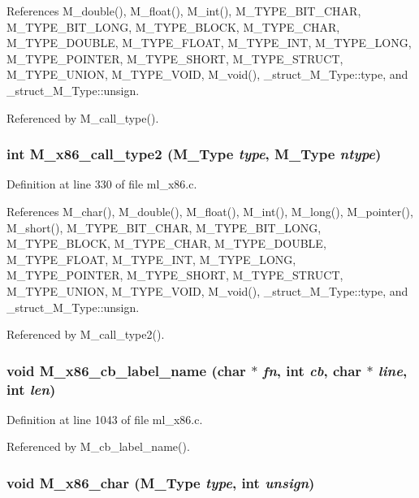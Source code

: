 References M\_\-double(), M\_\-float(), M\_\-int(), M\_\-TYPE\_\-BIT\_\-CHAR, M\_\-TYPE\_\-BIT\_\-LONG, M\_\-TYPE\_\-BLOCK, M\_\-TYPE\_\-CHAR, M\_\-TYPE\_\-DOUBLE, M\_\-TYPE\_\-FLOAT, M\_\-TYPE\_\-INT, M\_\-TYPE\_\-LONG, M\_\-TYPE\_\-POINTER, M\_\-TYPE\_\-SHORT, M\_\-TYPE\_\-STRUCT, M\_\-TYPE\_\-UNION, M\_\-TYPE\_\-VOID, M\_\-void(), \_\-struct\_\-M\_\-Type::type, and \_\-struct\_\-M\_\-Type::unsign.

Referenced by M\_\-call\_\-type().
\subsubsection{\setlength{\rightskip}{0pt plus 5cm}int M\_\-x86\_\-call\_\-type2 (\bf{M\_\-Type} {\em type}, \bf{M\_\-Type} {\em ntype})}\label{m__x86_8h_a2b8eeed98c4e10d36db0cf9955b7a13}




Definition at line 330 of file ml\_\-x86.c.

References M\_\-char(), M\_\-double(), M\_\-float(), M\_\-int(), M\_\-long(), M\_\-pointer(), M\_\-short(), M\_\-TYPE\_\-BIT\_\-CHAR, M\_\-TYPE\_\-BIT\_\-LONG, M\_\-TYPE\_\-BLOCK, M\_\-TYPE\_\-CHAR, M\_\-TYPE\_\-DOUBLE, M\_\-TYPE\_\-FLOAT, M\_\-TYPE\_\-INT, M\_\-TYPE\_\-LONG, M\_\-TYPE\_\-POINTER, M\_\-TYPE\_\-SHORT, M\_\-TYPE\_\-STRUCT, M\_\-TYPE\_\-UNION, M\_\-TYPE\_\-VOID, M\_\-void(), \_\-struct\_\-M\_\-Type::type, and \_\-struct\_\-M\_\-Type::unsign.

Referenced by M\_\-call\_\-type2().
\subsubsection{\setlength{\rightskip}{0pt plus 5cm}void M\_\-x86\_\-cb\_\-label\_\-name (char $\ast$ {\em fn}, int {\em cb}, char $\ast$ {\em line}, int {\em len})}\label{m__x86_8h_c47605e04d84eb266b6b962b0e12ad75}




Definition at line 1043 of file ml\_\-x86.c.

Referenced by M\_\-cb\_\-label\_\-name().
\subsubsection{\setlength{\rightskip}{0pt plus 5cm}void M\_\-x86\_\-char (\bf{M\_\-Type} {\em type}, int {\em unsign})}\label{m__x86_8h_c87f1b1fd6219e94d47ba2735565f358}




